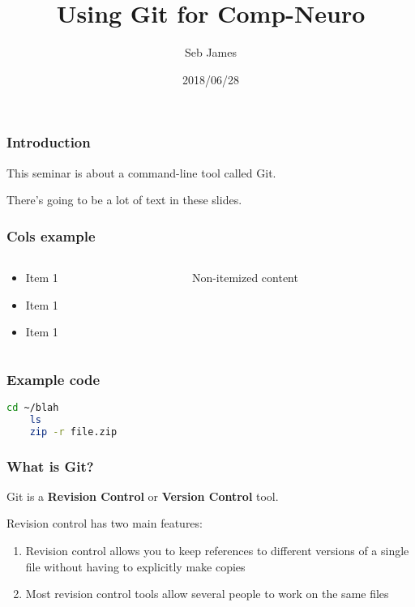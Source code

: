 \documentclass{beamer}
\title{Using Git for Comp-Neuro}
\author{Seb James}
\institute{ABRG Sheffield Internal Seminar}
\date{2018/06/28}
\begin{document}
\begin{frame}
  \titlepage %
\end{frame}

\begin{frame}
  \frametitle{Introduction}
  This seminar is about a command-line tool called Git.

  There's going to be a lot of \alert{text} in these slides.
\end{frame}

\begin{frame}
  \frametitle{Cols example}
  \begin{columns}
    \begin{column}{0.5\textwidth}
      \begin{itemize}
        \item Item 1
        \item Item 1
        \item Item 1
      \end{itemize}
    \end{column}
    \begin{column}{0.5\textwidth}
      Non-itemized content
    \end{column}
  \end{columns}
\end{frame}

\begin{frame}[fragile] %
  \frametitle{Example code}
  \begin{lstlisting}[language=bash]
    cd ~/blah
    ls
    zip -r file.zip
  \end{lstlisting}
\end{frame}

\begin{frame}
  \frametitle{What is Git?}
  Git is a \textbf{Revision Control} or \textbf{Version Control} tool.

  Revision control has two main features:

  \begin{enumerate}
    \pause \item Revision control allows you to keep references to different versions of a
      single file \pause without having to explicitly make copies
      \pause \item Most revision control tools allow several people to work
      on the same files %
  \end{enumerate}
\end{frame}
\end{document}
